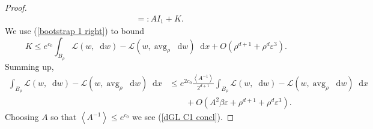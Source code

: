 \documentclass[reqno,10pt]{amsart}
\newcommand{\Hyp}{\mathbf H}
\DeclareMathOperator{\avg}{avg}
\newcommand*\dif{\mathop{}\!\mathrm{d}}
\newcommand{\Lagrange}{\mathscr L}
\def\Japan#1{\left \langle #1 \right \rangle}
\newtheorem{proposition}[theorem]{Proposition}
\theoremstyle{definition}
\numberwithin{equation}{section}
\begin{document}
\begin{proof}
\begin{align*}
&=: AI_1 + K.
\end{align*}
We use (\ref{bootstrap 1 right}) to bound 
$$K \leq e^{c_0} \int_{B_\rho} \Lagrange(w, \dif w) - \Lagrange(w, \avg_\rho \dif w) \dif x + O(\rho^{d + 1} + \rho^d \varepsilon^3).$$
Summing up,
\begin{align*}
\int_{B_\rho} \Lagrange(w, \dif w) - \Lagrange(w, \avg_\rho \dif w) \dif x &\leq e^{2c_0} \frac{\Japan{A^{-1}}}{2^{d + 1}} \int_{B_\rho} \Lagrange(w, \dif w) - \Lagrange(w, \avg_\rho \dif w) \dif x \\
&\qquad + O(A^2 \beta \varepsilon + \rho^{d + 1} + \rho^d \varepsilon^3).
\end{align*}
Choosing $A$ so that $\Japan{A^{-1}} \leq e^{c_0}$ we see (\ref{dGL C1 concl}).
\end{proof}




\end{document}
